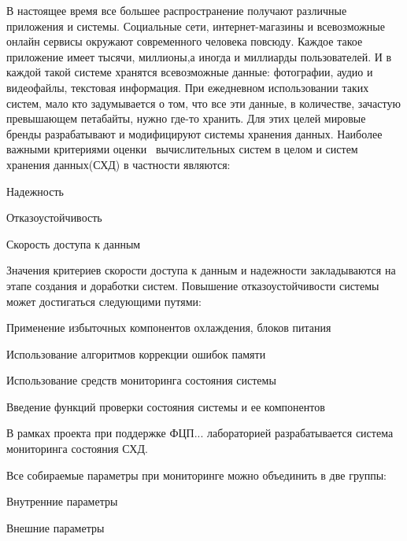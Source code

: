 \intro

В настоящее время все большее распространение получают различные приложения и системы. Социальные сети, интернет-магазины и всевозможные онлайн сервисы окружают современного человека повсюду. Каждое такое приложение имеет тысячи, миллионы,а иногда и миллиарды пользователей. И в каждой такой системе хранятся всевозможные данные: фотографии,  аудио и видеофайлы, текстовая информация. При ежедневном использовании таких систем, мало кто задумывается о том, что все эти данные, в количестве, зачастую превышающем петабайты, нужно где-то хранить. Для этих целей мировые бренды разрабатывают и модифицируют системы хранения данных. Наиболее важными критериями оценки~\cite{reliability} вычислительных систем в целом и систем хранения данных(СХД) в частности являются: 
\begin{itemize*}
	\item{Надежность}
	\item{Отказоустойчивость}
	\item{Скорость доступа к данным}
\end{itemize*}	
Значения критериев скорости доступа к данным и надежности закладываются на этапе создания и доработки систем. Повышение отказоустойчивости системы может достигаться следующими путями:
\begin{itemize*}
	\item{Применение избыточных компонентов охлаждения, блоков питания}
	\item{Использование алгоритмов коррекции ошибок памяти}
	\item{Использование средств мониторинга состояния системы}
	\item{Введение функций проверки состояния системы и ее компонентов}
\end{itemize*}	

В рамках проекта при поддержке ФЦП... лабораторией разрабатывается система мониторинга состояния СХД. 

Все собираемые параметры при мониторинге можно объединить в две группы: 
\begin{itemize*}
	\item{Внутренние параметры}
	\item{Внешние параметры}
\end{itemize*}	


